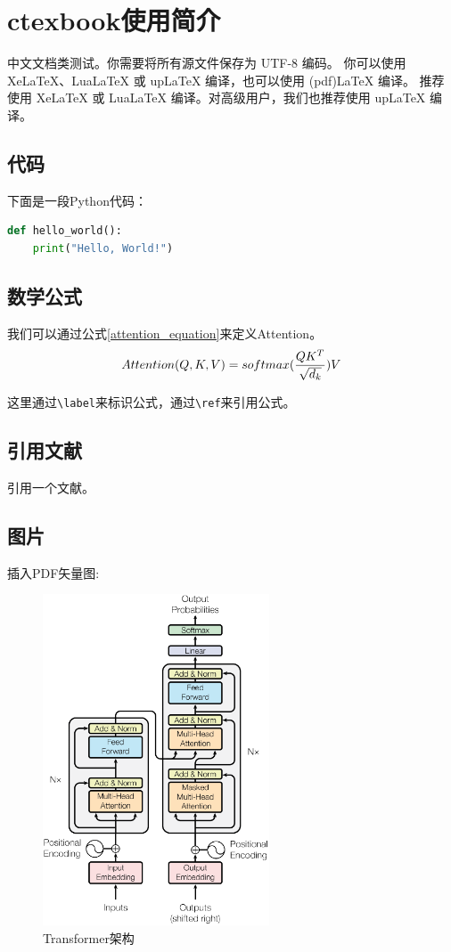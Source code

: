 \chapter{ctexbook使用简介}
\label{chap:ctexbook}

中文文档类测试。你需要将所有源文件保存为 UTF-8 编码。
你可以使用 XeLaTeX、LuaLaTeX 或 upLaTeX 编译，也可以使用 (pdf)LaTeX 编译。
推荐使用 XeLaTeX 或 LuaLaTeX 编译。对高级用户，我们也推荐使用 upLaTeX 编译。



\section{代码}


下面是一段Python代码：
\begin{lstlisting}[language=python, caption={Python代码示例}]
def hello_world():
    print("Hello, World!")
\end{lstlisting}


\section{数学公式}

我们可以通过公式\ref{attention_equation}来定义Attention。
\begin{equation}\label{attention_equation}\index{transformer}
    Attention(Q, K, V) = softmax(\frac{QK^T}{\sqrt{d_k}})V
\end{equation}

这里通过\texttt{\textbackslash label}来标识公式，通过\texttt{\textbackslash ref}来引用公式。

\section{引用文献}
引用一个文献\cite{siffer2017anomaly}。


\section{图片}
插入PDF矢量图:

\begin{figure}[htbp]
    \includegraphics[width=0.6\textwidth]{./figures/transformer.pdf}
    \centering
    \caption{Transformer架构\cite{vaswani2017attention}}
\end{figure}
